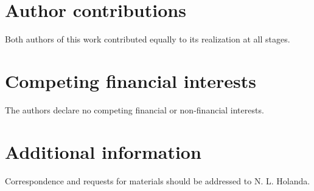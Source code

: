 \documentclass[10pt]{revtex4-1}
\begin{document}
\section*{Author contributions}

Both authors of this work contributed equally to its realization at all stages.

\section*{Competing financial interests}

The authors declare no competing financial or non-financial interests.

\section*{Additional information}

Correspondence and requests for materials should be addressed to N. L. Holanda. 
\end{document}
